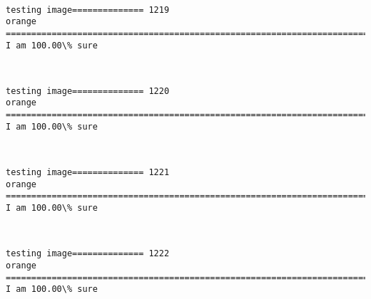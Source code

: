 \documentclass[11pt]{article}
\begin{document}
    \begin{center}
    \end{center}
    { \hspace*{\fill} \\}
    
    \begin{Verbatim}[commandchars=\\\{\}]
testing image============== 1219
orange
============================================================================
I am 100.00\% sure

    \end{Verbatim}

    \begin{center}
    \end{center}
    { \hspace*{\fill} \\}
    
    \begin{Verbatim}[commandchars=\\\{\}]
testing image============== 1220
orange
============================================================================
I am 100.00\% sure

    \end{Verbatim}

    \begin{center}
    \end{center}
    { \hspace*{\fill} \\}
    
    \begin{Verbatim}[commandchars=\\\{\}]
testing image============== 1221
orange
============================================================================
I am 100.00\% sure

    \end{Verbatim}

    \begin{center}
    \end{center}
    { \hspace*{\fill} \\}
    
    \begin{Verbatim}[commandchars=\\\{\}]
testing image============== 1222
orange
============================================================================
I am 100.00\% sure

    \end{Verbatim}
\end{document}
